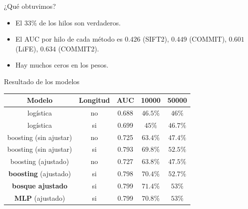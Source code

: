 \documentclass[12pt, aspectratio=43]{beamer}
\begin{document}
\begin{frame}{¿Qué obtuvimos?}
\begin{itemize}
    \item El $33 \% $ de los hilos son verdaderos. 
    \item El AUC por hilo de cada método es $0.426$ (SIFT2),
$0.449$ (COMMIT), $0.601$ (LiFE), $0.634$ (COMMIT2).
\item Hay muchos ceros en los pesos. 
\end{itemize}
    
\end{frame}

\begin{frame}{Resultado de los modelos}
    \begin{center}
\begin{tabular}{||c c c c c ||} 
 \hline
 Modelo & Longitud & AUC & 10000  &50000 \\ [0.5ex] 
 \hline\hline
 logística  & no & 0.688 & $46.5\%$  & $46 \% $ \\ 
 \hline
logística & si & 0.699 & $45 \%$  & $46.7 \%$ \\
\hline
boosting (sin ajustar) & no & 0.725 & $63.4 \%$ & $47.4 \%$ \\
\hline
 boosting (sin ajustar) & si & 0.793 & $69.8 \%$  & $52.5 \%$ \\
 \hline
 boosting (ajustado) & no & 0.727 & $63.8 \%$ & $47.5 \%$ \\
 \hline
 \textbf{boosting} (ajustado) & si & 0.798 & $70.4 \%$ & $52.7 \%$ \\
 \hline
  \textbf{bosque ajustado} & si & 0.799 & $71.4 \%$ & $53 \%$ \\
  \hline
  \textbf{MLP} (ajustado) & si & 0.799 & $70.8 \%$ & $53 \%$ \\
 \hline
\end{tabular}
\caption{AUC y porcentaje de hilos verdaderos entre los 10 000 y 50 000 de mayor puntaje.}
    \label{tab:ejemplo}
\end{center}
\end{frame}
\end{document}

